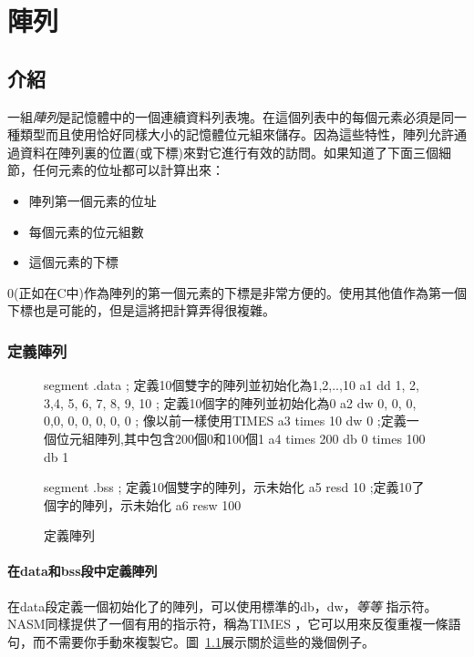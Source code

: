 \chapter{陣列}
\section{介紹}

一組\emph{陣列}是記憶體中的一個連續資料列表塊。在這個列表中的每個元素必須是同一種類型而且使用恰好同樣大小的記憶體位元組來儲存。因為這些特性，陣列允許通過資料在陣列裏的位置(或下標)來對它進行有效的訪問。如果知道了下面三個細節，任何元素的位址都可以計算出來：
\begin{itemize}
\item 陣列第一個元素的位址
\item 每個元素的位元組數
\item 這個元素的下標
\end{itemize}

0(正如在C中)作為陣列的第一個元素的下標是非常方便的。使用其他值作為第一個下標也是可能的，但是這將把計算弄得很複雜。

\subsection{定義陣列}

\begin{figure}[t]
\begin{AsmCodeListing}[frame=single]
segment .data
; 定義10個雙字的陣列並初始化為1,2,..,10
a1           dd 1, 2, 3,4, 5, 6, 7, 8, 9, 10
; 定義10個字的陣列並初始化為0
a2           dw 0, 0, 0, 0,0, 0, 0, 0, 0, 0
; 像以前一樣使用TIMES
a3           times 10 dw 0
;定義一個位元組陣列,其中包含200個0和100個1
a4           times 200 db 0
             times 100 db 1

segment .bss
; 定義10個雙字的陣列，示未始化
a5           resd  10
;定義10了個字的陣列，示未始化
a6           resw  100
\end{AsmCodeListing}
\caption{定義陣列\label{fig:DataArrays}}
\end{figure}

\subsubsection{在{\code data}和{\code bss}段中定義陣列
               }

在{\code data}段定義一個初始化了的陣列，可以使用標準的{\code db}，{\code dw}，\emph{等等}
指示符。NASM同樣提供了一個有用的指示符，稱為{\code TIMES} ，它可以用來反復重複一條語句，而不需要你手動來複製它。圖~\ref{fig:DataArrays}展示關於這些的幾個例子。

